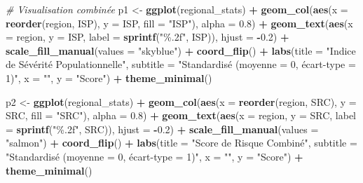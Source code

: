 \documentclass[
]{article}
\newenvironment{Shaded}{\begin{snugshade}}{\end{snugshade}}
\newcommand{\AttributeTok}[1]{\textcolor[rgb]{0.13,0.29,0.53}{#1}}
\newcommand{\CommentTok}[1]{\textcolor[rgb]{0.56,0.35,0.01}{\textit{#1}}}
\newcommand{\FloatTok}[1]{\textcolor[rgb]{0.00,0.00,0.81}{#1}}
\newcommand{\FunctionTok}[1]{\textcolor[rgb]{0.13,0.29,0.53}{\textbf{#1}}}
\newcommand{\NormalTok}[1]{#1}
\newcommand{\OtherTok}[1]{\textcolor[rgb]{0.56,0.35,0.01}{#1}}
\newcommand{\SpecialCharTok}[1]{\textcolor[rgb]{0.81,0.36,0.00}{\textbf{#1}}}
\newcommand{\StringTok}[1]{\textcolor[rgb]{0.31,0.60,0.02}{#1}}
\begin{document}
\begin{Shaded}
\begin{Highlighting}[]
\CommentTok{\# Visualisation combinée}
\NormalTok{p1 }\OtherTok{\textless{}{-}} \FunctionTok{ggplot}\NormalTok{(regional\_stats) }\SpecialCharTok{+}
  \FunctionTok{geom\_col}\NormalTok{(}\FunctionTok{aes}\NormalTok{(}\AttributeTok{x =} \FunctionTok{reorder}\NormalTok{(region, ISP), }\AttributeTok{y =}\NormalTok{ ISP, }\AttributeTok{fill =} \StringTok{"ISP"}\NormalTok{), }\AttributeTok{alpha =} \FloatTok{0.8}\NormalTok{) }\SpecialCharTok{+}
  \FunctionTok{geom\_text}\NormalTok{(}\FunctionTok{aes}\NormalTok{(}\AttributeTok{x =}\NormalTok{ region, }\AttributeTok{y =}\NormalTok{ ISP, }
                \AttributeTok{label =} \FunctionTok{sprintf}\NormalTok{(}\StringTok{"\%.2f"}\NormalTok{, ISP)), }\AttributeTok{hjust =} \SpecialCharTok{{-}}\FloatTok{0.2}\NormalTok{) }\SpecialCharTok{+}
  \FunctionTok{scale\_fill\_manual}\NormalTok{(}\AttributeTok{values =} \StringTok{"skyblue"}\NormalTok{) }\SpecialCharTok{+}
  \FunctionTok{coord\_flip}\NormalTok{() }\SpecialCharTok{+}
  \FunctionTok{labs}\NormalTok{(}\AttributeTok{title =} \StringTok{"Indice de Sévérité Populationnelle"}\NormalTok{,}
       \AttributeTok{subtitle =} \StringTok{"Standardisé (moyenne = 0, écart{-}type = 1)"}\NormalTok{,}
       \AttributeTok{x =} \StringTok{""}\NormalTok{, }\AttributeTok{y =} \StringTok{"Score"}\NormalTok{) }\SpecialCharTok{+}
  \FunctionTok{theme\_minimal}\NormalTok{()}

\NormalTok{p2 }\OtherTok{\textless{}{-}} \FunctionTok{ggplot}\NormalTok{(regional\_stats) }\SpecialCharTok{+}
  \FunctionTok{geom\_col}\NormalTok{(}\FunctionTok{aes}\NormalTok{(}\AttributeTok{x =} \FunctionTok{reorder}\NormalTok{(region, SRC), }\AttributeTok{y =}\NormalTok{ SRC, }\AttributeTok{fill =} \StringTok{"SRC"}\NormalTok{), }\AttributeTok{alpha =} \FloatTok{0.8}\NormalTok{) }\SpecialCharTok{+}
  \FunctionTok{geom\_text}\NormalTok{(}\FunctionTok{aes}\NormalTok{(}\AttributeTok{x =}\NormalTok{ region, }\AttributeTok{y =}\NormalTok{ SRC,}
                \AttributeTok{label =} \FunctionTok{sprintf}\NormalTok{(}\StringTok{"\%.2f"}\NormalTok{, SRC)), }\AttributeTok{hjust =} \SpecialCharTok{{-}}\FloatTok{0.2}\NormalTok{) }\SpecialCharTok{+}
  \FunctionTok{scale\_fill\_manual}\NormalTok{(}\AttributeTok{values =} \StringTok{"salmon"}\NormalTok{) }\SpecialCharTok{+}
  \FunctionTok{coord\_flip}\NormalTok{() }\SpecialCharTok{+}
  \FunctionTok{labs}\NormalTok{(}\AttributeTok{title =} \StringTok{"Score de Risque Combiné"}\NormalTok{,}
       \AttributeTok{subtitle =} \StringTok{"Standardisé (moyenne = 0, écart{-}type = 1)"}\NormalTok{,}
       \AttributeTok{x =} \StringTok{""}\NormalTok{, }\AttributeTok{y =} \StringTok{"Score"}\NormalTok{) }\SpecialCharTok{+}
  \FunctionTok{theme\_minimal}\NormalTok{()}


\end{Highlighting}
\end{Shaded}
\end{document}

